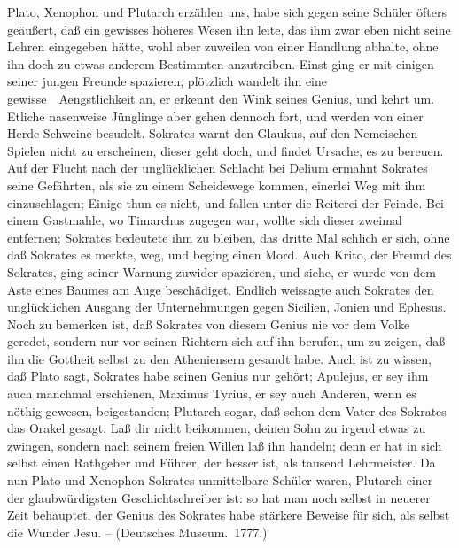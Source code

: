 \begin{aufza}
\item Plato, Xenophon und Plutarch erzählen uns,  habe sich gegen seine Schüler öfters geäußert, daß ein gewisses höheres Wesen ihn leite, das ihm zwar eben nicht seine Lehren eingegeben hätte, wohl aber zuweilen von einer Handlung abhalte, ohne ihn doch zu etwas anderem Bestimmten anzutreiben.
Einst ging er mit einigen seiner jungen Freunde spazieren; plötzlich wandelt ihn eine gewisse~\ Aengstlichkeit an, er erkennt den Wink seines Genius, und kehrt um. Etliche nasenweise Jünglinge aber gehen dennoch fort, und werden von einer Herde Schweine besudelt. Sokrates warnt den Glaukus, auf den Nemeischen Spielen nicht zu erscheinen, dieser geht doch, und findet Ursache, es zu bereuen. Auf der Flucht nach der unglücklichen Schlacht bei Delium ermahnt Sokrates seine Gefährten, als sie zu einem Scheidewege kommen, einerlei Weg mit ihm einzuschlagen; Einige thun es nicht, und fallen unter die Reiterei der Feinde. Bei einem Gastmahle, wo Timarchus zugegen war, wollte sich dieser zweimal entfernen; Sokrates bedeutete ihm zu bleiben, das dritte Mal schlich er sich, ohne daß Sokrates es merkte, weg, und beging einen Mord. Auch Krito, der Freund des Sokrates, ging seiner Warnung zuwider spazieren, und siehe, er wurde von dem Aste eines Baumes am Auge beschädiget. Endlich weissagte auch Sokrates den unglücklichen Ausgang der Unternehmungen gegen Sicilien, Jonien und Ephesus. Noch zu bemerken ist, daß Sokrates von diesem Genius nie vor dem Volke geredet, sondern nur vor seinen Richtern sich auf ihn berufen, um zu zeigen, daß ihn die Gottheit selbst zu den Atheniensern gesandt habe. Auch ist zu wissen, daß Plato sagt, Sokrates habe seinen Genius nur gehört; Apulejus, er sey ihm auch manchmal erschienen, Maximus Tyrius, er sey auch Anderen, wenn es nöthig gewesen, beigestanden; Plutarch sogar, daß schon dem Vater des Sokrates das Orakel gesagt: Laß dir nicht beikommen, deinen Sohn zu irgend etwas zu zwingen, sondern nach seinem freien Willen laß ihn handeln; denn er hat in sich selbst einen Rathgeber und Führer, der besser ist, als tausend Lehrmeister. Da nun Plato und Xenophon Sokrates unmittelbare Schüler waren, Plutarch einer der glaubwürdigsten Geschichtschreiber ist: so hat man noch selbst in neuerer Zeit behauptet, der Genius des Sokrates habe stärkere Beweise für sich, als selbst die Wunder Jesu. -- (Deutsches Museum.\ 1777.)

\end{aufza}
